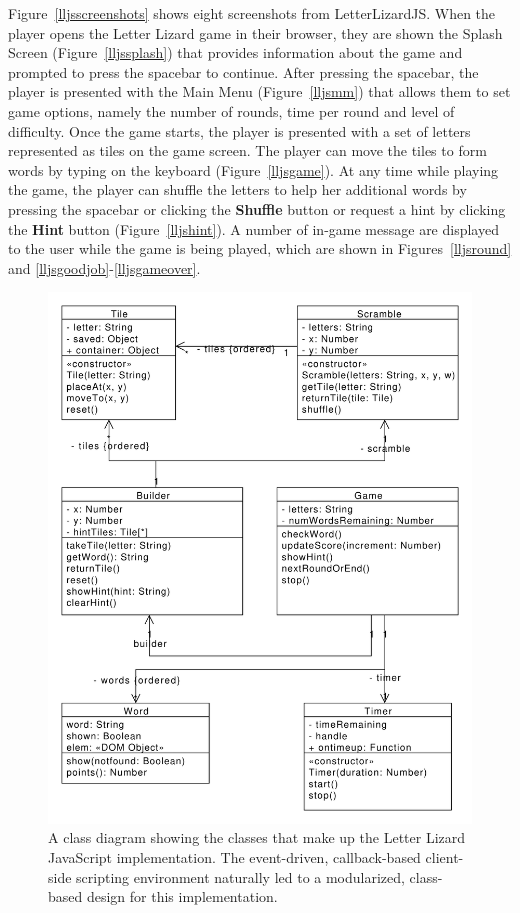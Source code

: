 Figure~\ref{lljsscreenshots} shows eight screenshots from LetterLizardJS. When the player
opens the Letter Lizard game in their browser, they are shown the Splash Screen
(Figure~\ref{lljssplash}) that provides information about the game and prompted to
press the spacebar to continue. After pressing the spacebar, the player is presented
with the Main Menu (Figure~\ref{lljsmm}) that allows them to set game options, namely
the number of rounds, time per round and level of difficulty. Once the game starts,
the player is presented with a set of letters represented as tiles on the game screen.
The player can move the tiles to form words by typing on the keyboard (Figure~\ref{lljsgame}).
At any time while playing the game, the player can shuffle the letters to help
her additional words by pressing the spacebar or clicking the \textbf{Shuffle} button
or request a hint by clicking the \textbf{Hint} button (Figure~\ref{lljshint}).
A number of in-game message are displayed to the user while the game is being played,
which are shown in Figures~\ref{lljsround} and \ref{lljsgoodjob}-\ref{lljsgameover}.

\begin{figure}
    \centering
	\includegraphics[scale=0.6]{../diagrams/LetterLizardJS-ClassDiagram.pdf}
	\caption{A class diagram showing the classes that make up the Letter
	Lizard JavaScript implementation. The event-driven, callback-based client-side scripting
	environment naturally led to a modularized, class-based design for this implementation.}
	\label{lljsclasses}
\end{figure}

